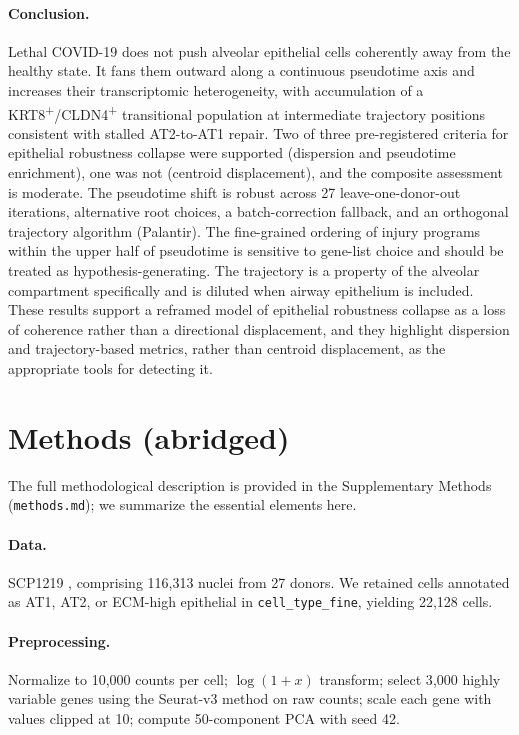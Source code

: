 \documentclass[11pt]{article}
\begin{document}
\paragraph{Conclusion.} Lethal COVID-19 does not push alveolar epithelial cells coherently away from the healthy state. It fans them outward along a continuous pseudotime axis and increases their transcriptomic heterogeneity, with accumulation of a KRT8\textsuperscript{+}/CLDN4\textsuperscript{+} transitional population at intermediate trajectory positions consistent with stalled AT2-to-AT1 repair. Two of three pre-registered criteria for epithelial robustness collapse were supported (dispersion and pseudotime enrichment), one was not (centroid displacement), and the composite assessment is moderate. The pseudotime shift is robust across 27 leave-one-donor-out iterations, alternative root choices, a batch-correction fallback, and an orthogonal trajectory algorithm (Palantir). The fine-grained ordering of injury programs within the upper half of pseudotime is sensitive to gene-list choice and should be treated as hypothesis-generating. The trajectory is a property of the alveolar compartment specifically and is diluted when airway epithelium is included. These results support a reframed model of epithelial robustness collapse as a loss of coherence rather than a directional displacement, and they highlight dispersion and trajectory-based metrics, rather than centroid displacement, as the appropriate tools for detecting it.

\section*{Methods (abridged)}

The full methodological description is provided in the Supplementary Methods (\texttt{methods.md}); we summarize the essential elements here.

\paragraph{Data.} SCP1219 \citep{Melms2021}, comprising 116{,}313 nuclei from 27 donors. We retained cells annotated as AT1, AT2, or ECM-high epithelial in \texttt{cell\_type\_fine}, yielding 22{,}128 cells.

\paragraph{Preprocessing.} Normalize to 10{,}000 counts per cell; $\log(1+x)$ transform; select 3{,}000 highly variable genes using the Seurat-v3 method on raw counts; scale each gene with values clipped at 10; compute 50-component PCA with seed 42.
\end{document}
